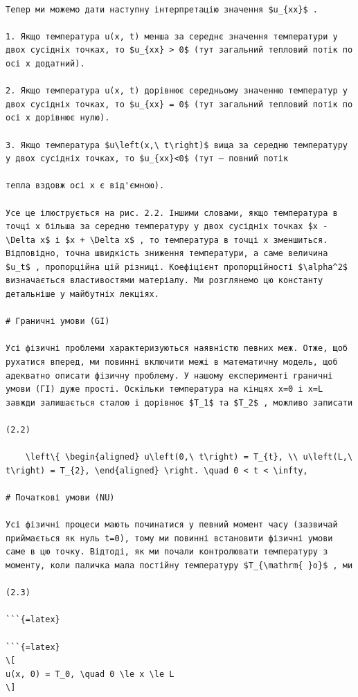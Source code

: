 \documentclass[
]{article}
\begin{document}
\begin{verbatim}

Тепер ми можемо дати наступну інтерпретацію значення $u_{xx}$ .

1. Якщо температура u(x, t) менша за середнє значення температури у двох сусідніх точках, то $u_{xx} > 0$ (тут загальний тепловий потік по осі x додатний).

2. Якщо температура u(x, t) дорівнює середньому значенню температур у двох сусідніх точках, то $u_{xx} = 0$ (тут загальний тепловий потік по осі x дорівнює нулю).

3. Якщо температура $u\left(x,\ t\right)$ вища за середню температуру у двох сусідніх точках, то $u_{xx}<0$ (тут — повний потік

тепла вздовж осі x є від'ємною).

Усе це ілюструється на рис. 2.2. Іншими словами, якщо температура в точці x більша за середню температуру у двох сусідніх точках $x - \Delta x$ і $x + \Delta x$ , то температура в точці x зменшиться. Відповідно, точна швидкість зниження температури, а саме величина $u_t$ , пропорційна цій різниці. Коефіцієнт пропорційності $\alpha^2$ визначається властивостями матеріалу. Ми розглянемо цю константу детальніше у майбутніх лекціях.

# Граничні умови (GI)

Усі фізичні проблеми характеризуються наявністю певних меж. Отже, щоб рухатися вперед, ми повинні включити межі в математичну модель, щоб адекватно описати фізичну проблему. У нашому експерименті граничні умови (ГІ) дуже прості. Оскільки температура на кінцях x=0 і x=L завжди залишається сталою і дорівнює $T_1$ та $T_2$ , можливо записати

(2.2)

    \left\{ \begin{aligned} u\left(0,\ t\right) = T_{t}, \\ u\left(L,\ t\right) = T_{2}, \end{aligned} \right. \quad 0 < t < \infty,

# Початкові умови (NU)

Усі фізичні процеси мають починатися у певний момент часу (зазвичай приймається як нуль t=0), тому ми повинні встановити фізичні умови саме в цю точку. Відтоді, як ми почали контролювати температуру з моменту, коли паличка мала постійну температуру $T_{\mathrm{ }o}$ , ми

(2.3)

```{=latex}

```{=latex}
\[
u(x, 0) = T_0, \quad 0 \le x \le L
\]
\end{verbatim}
\end{document}

